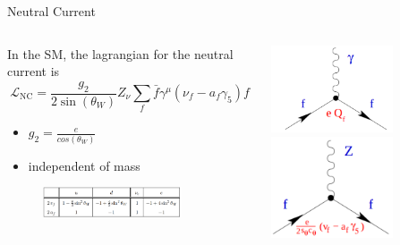 \begin{frame}{Neutral Current}
    \begin{columns}
        \begin{column}{0.65\textwidth}
            In the SM, the lagrangian for the neutral current is 
    \begin{equation*}
        \mathcal{L}_\text{NC} = \frac{g_2}{2 \sin{(\theta_W)}} Z_\nu \sum_f \bar{f} \gamma^\mu \left( \nu_f - a_f \gamma_5 \right) f
    \end{equation*}
    \begin{itemize}
        \item $ g_2 = \frac{e}{cos{(\theta_W)}} $
        \item independent of mass
    \end{itemize}
    \begin{figure}
        \centering
        \includegraphics[width=0.8\textwidth]{content/images/nc_coublings.png}
    \end{figure}
        \end{column}
        \begin{column}{0.35\textwidth}
            \includegraphics[width = 0.65\textwidth]{content/images/nc1.png}
            \includegraphics[width = 0.65\textwidth]{content/images/nc2.png}
        \end{column}
    \end{columns}
\end{frame}

